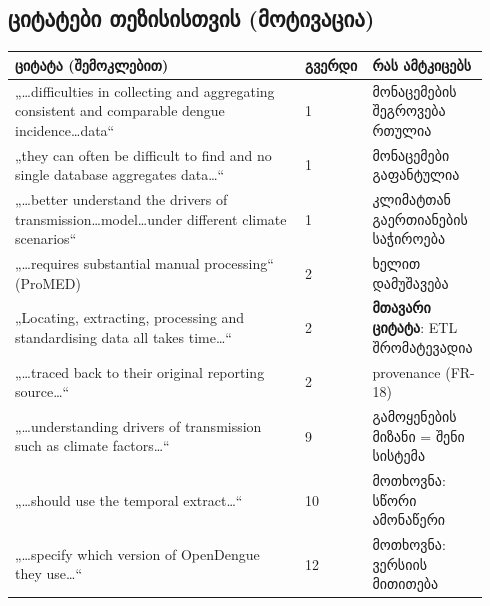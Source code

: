 \documentclass[11pt,a4paper]{article}
\begin{document}
\subsection*{ციტატები თეზისისთვის (მოტივაცია)}
\begin{longtable}{@{}p{0.6\linewidth}p{0.12\linewidth}p{0.22\linewidth}@{}}
\toprule
\textbf{ციტატა (შემოკლებით)} & \textbf{გვერდი} & \textbf{რას ამტკიცებს}\\
\midrule
„\ldots difficulties in collecting and aggregating consistent and comparable dengue incidence\ldots data“ & 1 & მონაცემების შეგროვება რთულია\\
„they can often be difficult to find and no single database aggregates data\ldots“ & 1 & მონაცემები გაფანტულია\\
„\ldots better understand the drivers of transmission\ldots model\ldots under different climate scenarios“ & 1 & კლიმატთან გაერთიანების საჭიროება\\
„\ldots requires substantial manual processing“ (ProMED) & 2 & ხელით დამუშავება\\
„Locating, extracting, processing and standardising data all takes time\ldots“ & 2 & \textbf{მთავარი ციტატა}: ETL შრომატევადია\\
„\ldots traced back to their original reporting source\ldots“ & 2 & provenance (FR-18)\\
„\ldots understanding drivers of transmission such as climate factors\ldots“ & 9 & გამოყენების მიზანი = შენი სისტემა\\
„\ldots should use the temporal extract\ldots“ & 10 & მოთხოვნა: სწორი ამონაწერი\\
„\ldots specify which version of OpenDengue they use\ldots“ & 12 & მოთხოვნა: ვერსიის მითითება\\
\bottomrule
\end{longtable}
\end{document}
